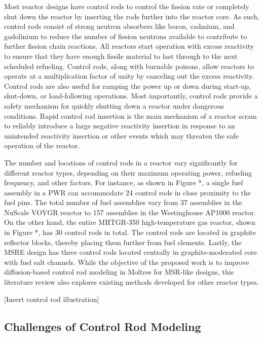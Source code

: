 Most reactor designs have control rods to control the fission rate or completely shut down the
reactor by inserting the rods further into the reactor core. As such, control rods consist of
strong neutron absorbers like boron, cadmium, and gadolinium to reduce the number of fission
neutrons available to contribute to further fission chain reactions. All reactors start operation
with excess reactivity to ensure that they have enough fissile material to last through to the next
scheduled refueling. Control rods, along with burnable poisons, allow reactors to operate at a
multiplication factor of unity by canceling out the excess reactivity. Control rods are also useful
for ramping the power up or down during start-up, shut-down, or load-following operations. Most
importantly, control rods provide a safety mechanism for quickly shutting down a reactor under
dangerous conditions. Rapid control rod insertion is the main mechanism of a reactor scram to
reliably introduce a large negative reactivity insertion in response to an unintended reactivity
insertion or other events which may threaten the safe operation of the reactor. 

The number and locations of control rods in a reactor vary significantly for different reactor
types, depending on their maximum operating power, refueling frequency, and other factors. For
instance, as shown in Figure *, a single fuel assembly in a \gls{PWR} can accommodate 24 control
rods in close proximity to the fuel pins. The total number of fuel assemblies vary from 37
assemblies in the NuScale VOYGR reactor to 157 assemblies in the Westinghouse AP1000 reactor. On
the other hand, the entire MHTGR-350 high-temperature gas reactor, shown in Figure *, has 30
control rods in total. The control rods are located in graphite reflector blocks, thereby placing
them further from fuel elements. Lastly, the \gls{MSRE} design has three control rods located
centrally in graphite-moderated core with fuel salt channels. While the objective of the proposed
work is to improve diffusion-based control rod modeling in Moltres for \gls{MSR}-like designs, this
literature review also explores existing methods developed for other reactor types.

[Insert control rod illustration]

\subsection{Challenges of Control Rod Modeling} \label{sec:challenges-control-rod}

